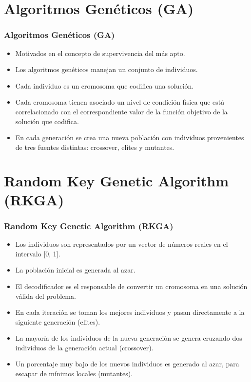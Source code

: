 \documentclass{beamer}
\begin{document}

\section{Algoritmos Genéticos (GA)}

\begin{frame}
\frametitle{Algoritmos Genéticos (GA)}

\begin{itemize}
    \item Motivados en el concepto de supervivencia del más apto.
    \pause
    \item Los algoritmos genéticos manejan un conjunto de individuos.
    \pause
    \item Cada individuo es un cromosoma que codifica una solución.
    \pause
    \item Cada cromosoma tienen asociado un nivel de condición física que está correlacionado con el correspondiente valor de la función objetivo de la solución que codifica.
    \pause
    \item En cada generación se crea una nueva población con individuos provenientes de tres fuentes distintas: crossover, elites y mutantes.
\end{itemize}

\end{frame}


\section{Random Key Genetic Algorithm (RKGA)}

\begin{frame}
\frametitle{Random Key Genetic Algorithm (RKGA)}

\begin{itemize}
    \item Los individuos son representados por un vector de números reales en el intervalo [0, 1].
    \pause
    \item La población inicial es generada al azar.
    \pause
    \item El decodificador es el responsable de convertir un cromosoma en una solución válida del problema.
    \pause
    \item En cada iteración se toman los mejores individuos y pasan directamente a la siguiente generación (elites).
    \pause
    \item La mayoría de los individuos de la nueva generación se genera cruzando dos individuos de la generación actual (crossover).
    \pause
    \item Un porcentaje muy bajo de los nuevos individuos es generado al azar, para escapar de mínimos locales (mutantes).
\end{itemize}

\end{frame}
\end{document}
